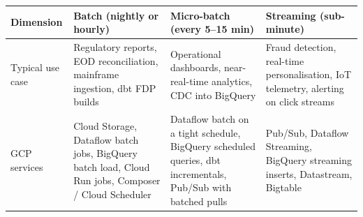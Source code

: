 \documentclass[
  11pt,
  british,
  oneside]{book}
\begin{document}
\begin{longtable}[]{@{}llll@{}}
\toprule
\begin{minipage}[b]{0.22\columnwidth}\raggedright
Dimension\strut
\end{minipage} & \begin{minipage}[b]{0.22\columnwidth}\raggedright
Batch (nightly or hourly)\strut
\end{minipage} & \begin{minipage}[b]{0.22\columnwidth}\raggedright
Micro-batch (every 5--15 min)\strut
\end{minipage} & \begin{minipage}[b]{0.22\columnwidth}\raggedright
Streaming (sub-minute)\strut
\end{minipage}\tabularnewline
\midrule
\endhead
\begin{minipage}[t]{0.22\columnwidth}\raggedright
Typical use case\strut
\end{minipage} & \begin{minipage}[t]{0.22\columnwidth}\raggedright
Regulatory reports, EOD reconciliation, mainframe ingestion, dbt FDP
builds\strut
\end{minipage} & \begin{minipage}[t]{0.22\columnwidth}\raggedright
Operational dashboards, near-real-time analytics, CDC into
BigQuery\strut
\end{minipage} & \begin{minipage}[t]{0.22\columnwidth}\raggedright
Fraud detection, real-time personalisation, IoT telemetry, alerting on
click streams\strut
\end{minipage}\tabularnewline
\begin{minipage}[t]{0.22\columnwidth}\raggedright
GCP services\strut
\end{minipage} & \begin{minipage}[t]{0.22\columnwidth}\raggedright
Cloud Storage, Dataflow batch jobs, BigQuery batch load, Cloud Run jobs,
Composer / Cloud Scheduler\strut
\end{minipage} & \begin{minipage}[t]{0.22\columnwidth}\raggedright
Dataflow batch on a tight schedule, BigQuery scheduled queries, dbt
incrementals, Pub/Sub with batched pulls\strut
\end{minipage} & \begin{minipage}[t]{0.22\columnwidth}\raggedright
Pub/Sub, Dataflow Streaming, BigQuery streaming inserts, Datastream,
Bigtable\strut
\end{minipage}\tabularnewline

\end{longtable}
\end{document}
